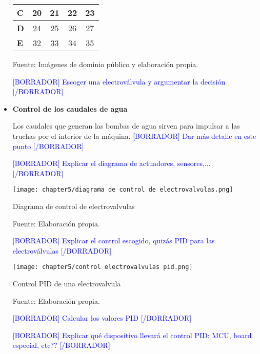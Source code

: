 \begin{itemize}
\begin{mytable}[H]
\begin{tabular}{l|c|c|c|c|}
			\multicolumn{1}{|l|}{\textbf{C}}          & 20                                                                    & 21         & 22         & 23         \\ \hline
			\multicolumn{1}{|l|}{\textbf{D}}          & 24                                                                    & 25         & 26         & 27         \\ \hline
			\multicolumn{1}{|l|}{\textbf{E}}          & 32                                                                    & 33         & 34         & 35         \\ \hline
		\end{tabular}	
		\begin{flushleft}			
			Fuente: Imágenes de dominio público y elaboración propia. 
		\end{flushleft}
	\end{mytable}
	
	\textcolor{blue}{[BORRADOR] Escoger una electroválvula y argumentar la decisión [/BORRADOR]}
	
	\item \textbf{Control de los caudales de agua}
	
	Los caudales que generan las bombas de agua sirven para impulsar a las truchas por el interior de la máquina. \textcolor{blue}{[BORRADOR] Dar más detalle en este punto [/BORRADOR]}
	
	\textcolor{blue}{[BORRADOR] Explicar el diagrama de actuadores, sensores,... [/BORRADOR]}
	
	\begin{myfigure}[H]
		\centering
		\texttt{[image: chapter5/diagrama de control de electrovalvulas.png]}
		\caption{Diagrama de control de electrovalvulas}
		\begin{myflushleftportland}
			Fuente: Elaboración propia.
		\end{myflushleftportland}
		\label{fig:diagrama de control de electrovalvulas}
	\end{myfigure}
	
	\textcolor{blue}{[BORRADOR] Explicar el control escogido, quizás PID para las electroválvulas [/BORRADOR]}
	
	\begin{myfigure}[H]
		\centering
		\texttt{[image: chapter5/control electrovalvulas pid.png]}
		\caption{Control PID de una electrovalvula}
		\begin{myflushleftportland}
			Fuente: Elaboración propia.
		\end{myflushleftportland}
		\label{fig:control electrovalvulas pid}
	\end{myfigure}
	
	\textcolor{blue}{[BORRADOR] Calcular los valores PID [/BORRADOR]}
	
	\textcolor{blue}{[BORRADOR] Explicar qué dispositivo llevará el control PID: MCU, board especial, etc?? [/BORRADOR]}	
	
\end{itemize}

